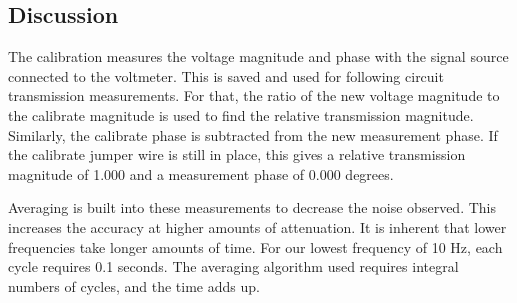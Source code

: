%
\subsection{Discussion}
\label{subsect:TDiscus}
The calibration measures the voltage magnitude and phase with the signal source connected to the voltmeter.  This is saved and used for following circuit transmission measurements.  For that, the ratio of the new voltage magnitude to the calibrate magnitude is used to find the relative transmission magnitude.  Similarly, the calibrate phase is subtracted from the new measurement phase.  If the calibrate jumper wire is still in place, this gives a relative  transmission magnitude of 1.000 and a measurement phase of 0.000 degrees.

Averaging is built into these measurements to decrease the noise observed.  This increases the accuracy at higher amounts of attenuation.  It is inherent that lower frequencies take longer amounts of time.  For our lowest frequency of 10 Hz, each cycle requires 0.1 seconds.  The averaging algorithm used requires integral numbers of cycles, and the time adds up.
